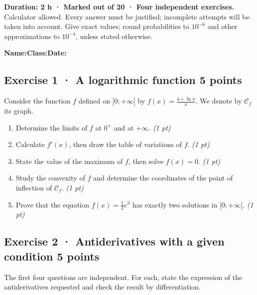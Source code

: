 \textbf{Duration: 2 h · Marked out of 20 · Four independent exercises.}\\Calculator allowed. Every answer must be justified; incomplete attempts will be taken into account. Give exact values; round probabilities to $10^{-6}$ and other approximations to $10^{-4}$, unless stated otherwise.

\smallskip\textbf{Name:}\enspace\dotfill\quad\textbf{Class:}\enspace\dotfill\quad\textbf{Date:}\enspace\dotfill

\subsection*{Exercise 1 · A logarithmic function \hfill 5 points}Consider the function $f$ defined on $]0;+\infty[$ by $f(x)=\frac{4+\ln x}x$. We denote by $\mathcal C_f$ its graph.

\begin{enumerate}

\item Determine the limits of $f$ at $0^+$ and at $+\infty$. \hfill\textit{(1 pt)}

\item Calculate $f' (x)$, then draw the table of variations of $f$. \hfill\textit{(1 pt)}

\item State the value of the maximum of $f$, then solve $f(x)=0$. \hfill\textit{(1 pt)}

\item Study the convexity of $f$ and determine the coordinates of the point of inflection of $\mathcal C_f$. \hfill\textit{(1 pt)}

\item Prove that the equation $f(x)=\frac12 e^{3}$ has exactly two solutions in $]0;+\infty[$. \hfill\textit{(1 pt)}

\end{enumerate}

\subsection*{Exercise 2 · Antiderivatives with a given condition \hfill 5 points}The first four questions are independent. For each, state the expression of the antiderivatives requested and check the result by differentiation.

